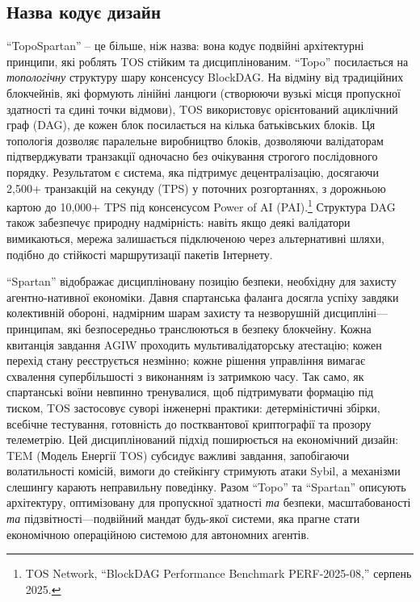 \documentclass[11pt]{article}
\begin{document}
\subsection{Назва кодує дизайн}
``TopoSpartan'' -- це більше, ніж назва: вона кодує подвійні архітектурні принципи, які роблять TOS стійким та дисциплінованим. ``Topo'' посилається на \emph{топологічну} структуру шару консенсусу BlockDAG. На відміну від традиційних блокчейнів, які формують лінійні ланцюги (створюючи вузькі місця пропускної здатності та єдині точки відмови), TOS використовує орієнтований ациклічний граф (DAG), де кожен блок посилається на кілька батьківських блоків. Ця топологія дозволяє паралельне виробництво блоків, дозволяючи валідаторам підтверджувати транзакції одночасно без очікування строгого послідовного порядку. Результатом є система, яка підтримує децентралізацію, досягаючи 2,500+ транзакцій на секунду (TPS) у поточних розгортаннях, з дорожньою картою до 10,000+ TPS під консенсусом Power of AI (PAI).\footnote{TOS Network, ``BlockDAG Performance Benchmark PERF-2025-08,'' серпень 2025.} Структура DAG також забезпечує природну надмірність: навіть якщо деякі валідатори вимикаються, мережа залишається підключеною через альтернативні шляхи, подібно до стійкості маршрутизації пакетів Інтернету.

``Spartan'' відображає дисципліновану позицію безпеки, необхідну для захисту агентно-нативної економіки. Давня спартанська фаланга досягла успіху завдяки колективній обороні, надмірним шарам захисту та незворушній дисципліні---принципам, які безпосередньо транслюються в безпеку блокчейну. Кожна квитанція завдання AGIW проходить мультивалідаторську атестацію; кожен перехід стану реєструється незмінно; кожне рішення управління вимагає схвалення супербільшості з виконанням із затримкою часу. Так само, як спартанські воїни невпинно тренувалися, щоб підтримувати формацію під тиском, TOS застосовує суворі інженерні практики: детерміністичні збірки, всебічне тестування, готовність до постквантової криптографії та прозору телеметрію. Цей дисциплінований підхід поширюється на економічний дизайн: TEM (Модель Енергії TOS) субсидує важливі завдання, запобігаючи волатильності комісій, вимоги до стейкінгу стримують атаки Sybil, а механізми слешингу карають неправильну поведінку. Разом ``Topo'' та ``Spartan'' описують архітектуру, оптимізовану для пропускної здатності \emph{та} безпеки, масштабованості \emph{та} підзвітності---подвійний мандат будь-якої системи, яка прагне стати економічною операційною системою для автономних агентів.
\end{document}
